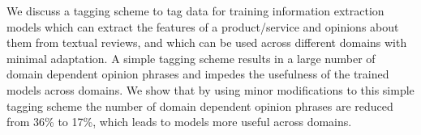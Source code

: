 We discuss a tagging scheme to tag data for training information extraction models which can extract the features of a product/service and opinions about
 them from textual reviews, and which can be used across different domains with
 minimal adaptation. A simple tagging scheme results in a large number of domain
 dependent opinion phrases and impedes the usefulness of the trained models
 across domains. We show that by using minor modifications to this simple
 tagging scheme the number of domain dependent opinion phrases are reduced from
 36\% to 17\%, which leads to models more useful across domains.

